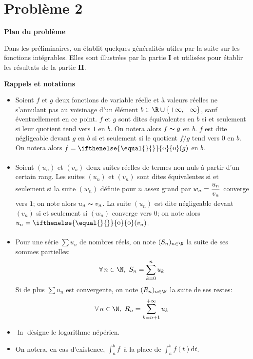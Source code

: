 \documentclass[twoside,french,11pt]{VcCours}
\newcommand{\dt}{\text{d}t}
\DeclareMathOperator*{\mypetito}{o}
\newcommand{\petito}[1][]{\ifthenelse{\equal{#1}{}}{\mypetito\limits}
  {{\mypetito\limits_{#1}}}}
\begin{document}
\vspace{2cm}
\section*{Problème 2}

\medskip

\textbf{Plan du problème}\smallbreak

\medskip

Dans les préliminaires, on établit quelques généralités utiles par
la suite sur les fonctions intégrables. Elles sont illustrées par la partie
{\bf I} et utilisées pour établir les résultats de la partie {\bf II}. 

\medskip

\textbf{Rappels et notations}\smallbreak

\begin{itemize}
\item Soient $f$ et $g$ deux fonctions de variable réelle et \`a valeurs réelles ne s'annulant pas au voisinage d'un élément $b \in \R\cup\{+\infty, -\infty\}$, sauf éventuellement en ce point. $f$ et $g$ sont dites équivalentes en $b$ si et seulement si leur quotient tend vers $1$ en $b$. On notera alors $f\thicksim g$ en $b$. $f$ est dite négligeable devant $g$ en $b$ si et seulement si le quotient $f/g$ tend vers $0$ en $b$. On notera alors $f=\petito(g)$ en $b$.\smallbreak
\item Soient $(u_n) $ et $(v_n)$ deux suites réelles de termes non nuls \`a partir d'un certain rang. Les suites $(u_n)$ et $(v_n)$ sont dites équivalentes si et seulement si la suite $(w_n)$ définie pour $n$ assez grand par $w_n = \dfrac{u_n}{v_n}_{\mathstrut}^{\mathstrut}$ converge vers $1$; on note alors $u_n \thicksim v_n$. La suite $(u_n)$ est dite négligeable devant $(v_n)$ si et seulement si $(w_n)$ converge vers $0$; on note alors $u_n = \petito(v_n)$. \smallbreak
\item Pour une série $\sum u_n$ de nombres réels, on note $(S_n)_{n\in \N}$ la suite de ses sommes partielles:
\[
\forall \, n\in \N,\ S_n = \sum_{k=0}^n u_k \,
\]
Si de plus $\sum u_n$ est convergente, on note $(R_n)_{n\in \N}$ la suite de ses restes:
\[
\forall\, n\in \N,\ R_n = \sum_{k=n+1}^{+\infty}u_k\,
\]

\item $\ln$ désigne le logarithme népérien.\smallbreak
\item On notera, en cas d'existence, $\int_a^b f \, $ à la place de $\int_a^b f(t) \dt$.
\end{itemize}
\end{document}
